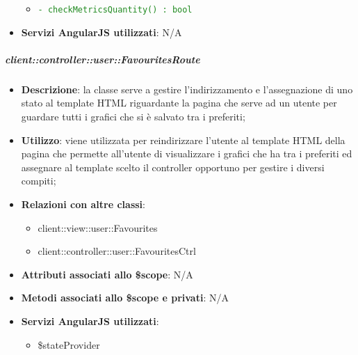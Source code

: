 \begin{itemize}
\begin{itemize}
						\item \textcolor{forestgreen}{\texttt{- checkMetricsQuantity() : bool}}
					\end{itemize}

				\item \textbf{Servizi AngularJS utilizzati}: N/A


			\end{itemize}

		\subparagraph{client::controller::user::FavouritesRoute} %
		\label{subp:bdsm_app_client_controller_user_favouritesroute}
			\begin{itemize}
				\item \textbf{Descrizione}: la classe serve a gestire l'indirizzamento e l'assegnazione di uno stato al template HTML riguardante la pagina che serve ad un utente per guardare tutti i grafici che si è salvato tra i preferiti;
				\item \textbf{Utilizzo}: viene utilizzata per reindirizzare l'utente al template HTML della pagina che permette all'utente di visualizzare i grafici che ha tra i preferiti ed assegnare al template scelto il controller opportuno per gestire i diversi compiti;
				\item \textbf{Relazioni con altre classi}:
					\begin{itemize}
						\item client::view::user::Favourites
						\item client::controller::user::FavouritesCtrl
					\end{itemize}
				\item \textbf{Attributi associati allo \$scope}: N/A
				\item \textbf{Metodi associati allo \$scope e privati}: N/A
				\item \textbf{Servizi AngularJS utilizzati}:
					\begin{itemize}
						\item \$stateProvider
					\end{itemize}
			\end{itemize}


